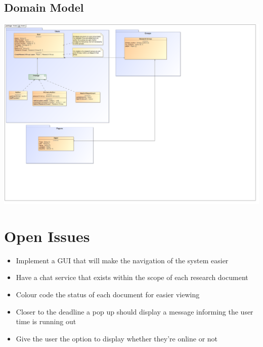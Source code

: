 \documentclass[11pt]{article}
\begin{document}
	\subsection{Domain Model}
	\begin{center}
		\includegraphics[width=\textwidth]{../Images/DomainModel.png}\\[0.5cm]
	\end{center}
	
	\section{Open Issues}
		\begin{itemize}
			\item Implement a GUI that will make the navigation of the system easier
			\item Have a chat service that exists within the scope of each research document
			\item Colour code the status of each document for easier viewing
			\item Closer to the deadline a pop up should display a message informing the user time is running out
			\item Give the user the option to display whether they're online or not
		\end{itemize}	
	\newpage
	
	{}
	
\end{document}
